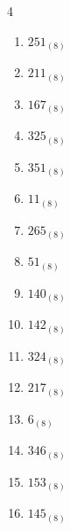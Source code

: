 \begin{multicols}{4}
\begin{enumerate}
  \item $251_{(8)}$

        \phantom{$=169$}

  \item $211_{(8)}$

        \phantom{$=137$}

  \item $167_{(8)}$

        \phantom{$=119$}

  \item $325_{(8)}$

        \phantom{$=213$}

  \item $351_{(8)}$

        \phantom{$=233$}

  \item $11_{(8)}$

        \phantom{$=9$}

\columnbreak %

  \item $265_{(8)}$

        \phantom{$=181$}

  \item $51_{(8)}$

        \phantom{$=41$}

  \item $140_{(8)}$

        \phantom{$=96$}

  \item $142_{(8)}$

        \phantom{$=98$}

  \item $324_{(8)}$

        \phantom{$=212$}

  \item $217_{(8)}$

        \phantom{$=143$}

  \item $6_{(8)}$

        \phantom{$=6$}

  \item $346_{(8)}$

        \phantom{$=230$}

  \item $153_{(8)}$

        \phantom{$=107$}

  \item $145_{(8)}$


\end{enumerate}
\end{multicols}

